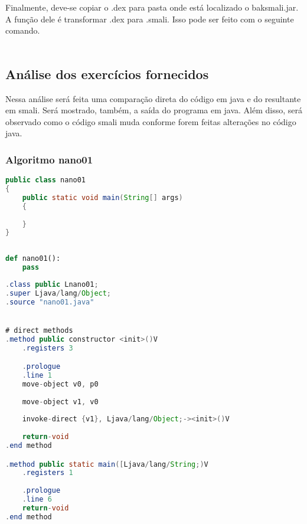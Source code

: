 \documentclass[hidelinks,12pt]{article}
\begin{document}
	Finalmente, deve-se copiar o .dex para pasta onde está localizado o baksmali.jar. A função dele é transformar .dex para .smali. Isso pode ser feito com o seguinte comando.\\
	
	\noindent{}\\	
		
	\subsection{Análise dos exercícios fornecidos}
	
	Nessa análise será feita uma comparação direta do código em java e do resultante em smali. Será mostrado, também, a saída do programa em java. Além disso, será observado como o código smali muda conforme forem feitas alterações no código java.
	
	\subsubsection{Algoritmo nano01}
	
	
	\begin{lstlisting}[caption=Código em Java,language=java]
public class nano01
{
	public static void main(String[] args)
	{
	
	}
}
	
	\end{lstlisting}
	
	\begin{lstlisting}[caption=Código em python,language=Python]
def nano01():
	pass

	\end{lstlisting}
	
\begin{lstlisting}[caption=Smali resultante do .java,language=java]
.class public Lnano01;
.super Ljava/lang/Object;
.source "nano01.java"


# direct methods
.method public constructor <init>()V
	.registers 3

	.prologue
	.line 1
	move-object v0, p0
	
	move-object v1, v0
	
	invoke-direct {v1}, Ljava/lang/Object;-><init>()V
	
	return-void
.end method

.method public static main([Ljava/lang/String;)V
	.registers 1
	
	.prologue
	.line 6
	return-void
.end method
	
	\end{lstlisting}
	
\end{document}
